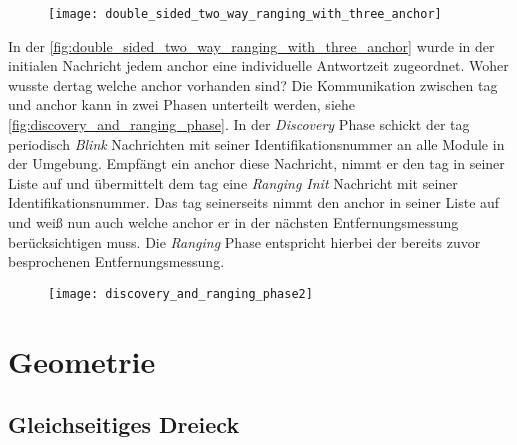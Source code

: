 \begin{figure}
	\centering
	\texttt{[image: double\_sided\_two\_way\_ranging\_with\_three\_anchor]}
	\label{fig:double_sided_two_way_ranging_with_three_anchor}
\end{figure}

In der \autoref{fig:double_sided_two_way_ranging_with_three_anchor} wurde in der initialen Nachricht jedem \Gls{anchor} eine individuelle Antwortzeit zugeordnet. Woher wusste der\Gls{tag} welche \Gls{anchor} vorhanden sind? Die Kommunikation zwischen \Gls{tag} und \Gls{anchor} kann in zwei Phasen unterteilt werden, siehe \autoref{fig:discovery_and_ranging_phase}. In der \textit{Discovery} Phase schickt der \Gls{tag} periodisch \textit{Blink} Nachrichten mit seiner Identifikationsnummer an alle Module in der Umgebung. Empfängt ein \Gls{anchor} diese Nachricht, nimmt er den \Gls{tag} in seiner Liste auf und übermittelt dem \Gls{tag} eine \textit{Ranging Init} Nachricht mit seiner Identifikationsnummer. Das \Gls{tag} seinerseits nimmt den \Gls{anchor} in seiner Liste auf und weiß nun auch welche \Gls{anchor} er in der nächsten Entfernungsmessung berücksichtigen muss. Die \textit{Ranging} Phase entspricht hierbei der bereits zuvor besprochenen Entfernungsmessung.

\begin{figure}
	\centering
	\texttt{[image: discovery\_and\_ranging\_phase2]}
	\label{fig:discovery_and_ranging_phase}
\end{figure}


%
%
%
\section{Geometrie}


%
%
%
\subsection{Gleichseitiges Dreieck}

